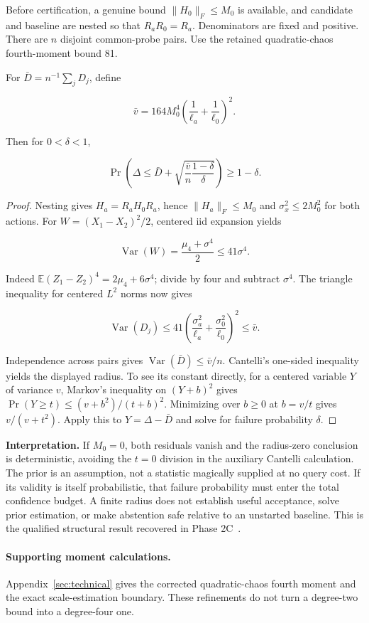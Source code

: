 \begin{theorem}\label{thm:T13}
Before certification, a genuine bound $\|H_0\|_F\le M_0$ is available, and candidate and baseline are nested so that $R_aR_0=R_a$. Denominators are fixed and positive. There are $n$ disjoint common-probe pairs. Use the retained quadratic-chaos fourth-moment bound 81.


For $\bar D=n^{-1}\sum_jD_j$, define


\begin{equation}
\bar v=164M_0^4\left(\frac1{\ell_a}+\frac1{\ell_0}\right)^2.
\end{equation}


Then for $0<\delta<1$,


\begin{equation}
\Pr\left(\Delta\le\bar D+
\sqrt{\frac{\bar v}{n}\frac{1-\delta}{\delta}}\right)\ge1-\delta.
\end{equation}


\end{theorem}
\begin{proof}
Nesting gives $H_a=R_aH_0R_a$, hence $\|H_a\|_F\le M_0$ and $\sigma_x^2\le2M_0^2$ for both actions. For $W=(X_1-X_2)^2/2$, centered iid expansion yields


\begin{equation}
\operatorname{Var}(W)=\frac{\mu_4+\sigma^4}{2}\le41\sigma^4.
\end{equation}


Indeed $\mathbb E(Z_1-Z_2)^4=2\mu_4+6\sigma^4$; divide by four and subtract $\sigma^4$. The triangle inequality for centered $L^2$ norms now gives


\begin{equation}
\operatorname{Var}(D_j)\le41
\left(\frac{\sigma_a^2}{\ell_a}+\frac{\sigma_0^2}{\ell_0}\right)^2\le\bar v.
\end{equation}


Independence across pairs gives $\operatorname{Var}(\bar D)\le\bar v/n$. Cantelli's one-sided inequality yields the displayed radius. To see its constant directly, for a centered variable $Y$ of variance $v$, Markov's inequality on $(Y+b)^2$ gives $\Pr(Y\ge t)\le(v+b^2)/(t+b)^2$. Minimizing over $b\ge0$ at $b=v/t$ gives $v/(v+t^2)$. Apply this to $Y=\Delta-\bar D$ and solve for failure probability $\delta$.

\end{proof}


\textbf{Interpretation.} If $M_0=0$, both residuals vanish and the radius-zero conclusion is deterministic, avoiding the $t=0$ division in the auxiliary Cantelli calculation. The prior is an assumption, not a statistic magically supplied at no query cost. If its validity is itself probabilistic, that failure probability must enter the total confidence budget. A finite radius does not establish useful acceptance, solve prior estimation, or make abstention safe relative to an unstarted baseline. This is the qualified structural result recovered in Phase 2C~\cite{project2026}.

\paragraph{Supporting moment calculations.} Appendix~\ref{sec:technical} gives the corrected quadratic-chaos fourth moment and the exact scale-estimation boundary. These refinements do not turn a degree-two bound into a degree-four one.
